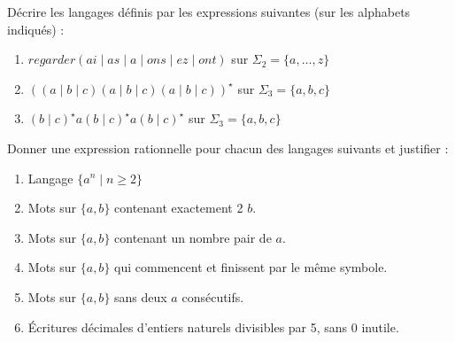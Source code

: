 
\begingroup

\begin{exercice}\label{exo:lexing/regexp/revision}

  \begin{questions}

  \item Décrire les langages définis par les expressions suivantes (sur les alphabets indiqués) :
    \begin{enumerate}
    \item $\mathit{regarder}(ai\mid as\mid a\mid ons\mid ez\mid ont)$ \hfill sur $\Sigma_2=\{a,\dots,z\}$
    \item $((a\mid b\mid c)(a\mid b\mid c)(a\mid b\mid c))^\star$ \hfill sur $\Sigma_3=\{a,b,c\}$
    \item $(b\mid c)^\star a(b\mid c)^\star a(b\mid c)^\star$ \hfill sur $\Sigma_3=\{a,b,c\}$
    \end{enumerate}

  \item Donner une expression rationnelle pour chacun des langages suivants et justifier :
    \begin{enumerate}
    \item Langage $\{a^n \mid n \geq  2\}$
    \item Mots sur $\{a,b\}$ contenant exactement 2 $b$.
    \item Mots sur $\{a,b\}$ contenant un nombre pair de $a$.
    \item Mots sur $\{a,b\}$ qui commencent et finissent par le même symbole.
    \item Mots sur $\{a,b\}$ sans deux $a$ consécutifs.
    \item Écritures décimales d'entiers naturels divisibles par 5, sans $0$ inutile.
    \end{enumerate}

  \end{questions}

\end{exercice}

